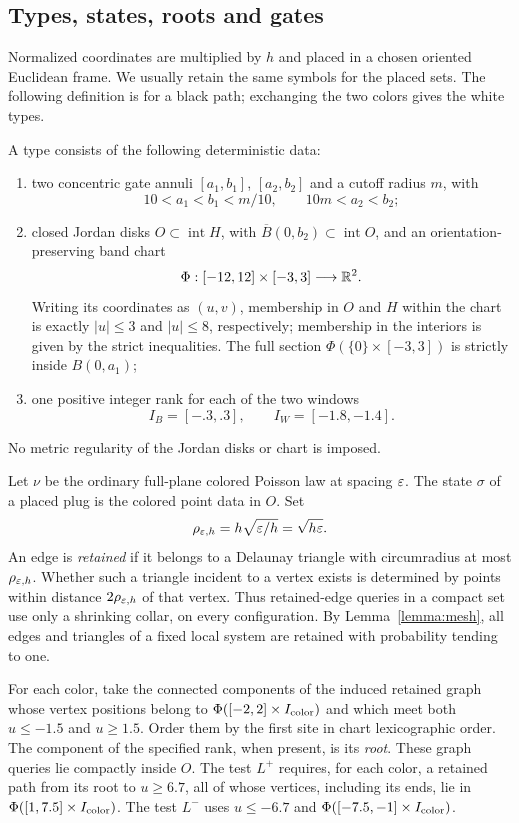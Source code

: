 \subsection{Types, states, roots and gates}

Normalized coordinates are multiplied by $h$ and placed in a chosen
oriented Euclidean frame.  We usually retain the same symbols for the
placed sets.  The following definition is for a black path; exchanging
the two colors gives the white types.

\begin{definition}\label{def:plug-type}
A type consists of the following deterministic data:
\begin{enumerate}[label=\textup{(\roman*)}]
\item two concentric gate annuli $[a_1,b_1]$, $[a_2,b_2]$ and a cutoff
radius $m$, with
\[
 10<a_1<b_1<m/10,\qquad 10m<a_2<b_2;
\]
\item closed Jordan disks $O\subset\operatorname{int}H$, with
$\overline B(0,b_2)\subset\operatorname{int}O$, and an
orientation-preserving band chart
\[
 \Phi:[-12,12]\times[-3,3]\longrightarrow\mathbb R^2.
\]
Writing its coordinates as $(u,v)$, membership in $O$ and $H$ within the
chart is exactly $|u|\le3$ and $|u|\le8$, respectively; membership in the
interiors is given by the strict inequalities.  The full section
$\Phi(\{0\}\times[-3,3])$ is strictly inside $B(0,a_1)$;
\item one positive integer rank for each of the two windows
\[
 I_B=[-.3,.3],\qquad I_W=[-1.8,-1.4].
\]
\end{enumerate}
No metric regularity of the Jordan disks or chart is imposed.
\end{definition}

Let $\nu$ be the ordinary full-plane colored Poisson law at spacing
$\varepsilon$.  The state $\sigma$ of a placed plug is the colored point data in
$O$.  Set
\[
 \rho_{\varepsilon,h}=h\sqrt{\varepsilon/h}=\sqrt{h\varepsilon}.
\]
An edge is \emph{retained} if it belongs to a Delaunay triangle with
circumradius at most $\rho_{\varepsilon,h}$.  Whether such a triangle incident to
a vertex exists is determined by points within distance
$2\rho_{\varepsilon,h}$ of that vertex.  Thus retained-edge queries in a compact
set use only a shrinking collar, on every configuration.  By
Lemma~\ref{lemma:mesh}, all edges and triangles of a fixed local system
are retained with probability tending to one.

For each color, take the connected components of the induced retained
graph whose vertex positions belong to
$\Phi([-2,2]\times I_{\rm color})$ and which meet both $u\le-1.5$ and
$u\ge1.5$.  Order them by the first site in chart lexicographic order.
The component of the specified rank, when present, is its \emph{root}.
These graph queries lie compactly inside $O$.  The test $L^+$ requires,
for each color, a retained path from its root to $u\ge6.7$, all of whose
vertices, including its ends, lie in $\Phi([1,7.5]\times I_{\rm color})$.
The test $L^-$ uses $u\le-6.7$ and
$\Phi([-7.5,-1]\times I_{\rm color})$.

